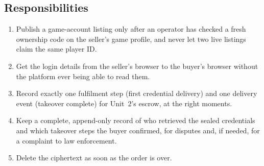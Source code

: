 \documentclass[11pt,a4paper]{article}
\begin{document}
\subsection{Responsibilities}
\begin{enumerate}[nosep]
  \item Publish a game-account listing only after an operator has checked a fresh ownership code on the seller's game profile, and never let two live listings claim the same player ID.
  \item Get the login details from the seller's browser to the buyer's browser without the platform ever being able to read them.
  \item Record exactly one fulfilment step (first credential delivery) and one delivery event (takeover complete) for Unit~2's escrow, at the right moments.
  \item Keep a complete, append-only record of who retrieved the sealed credentials and which takeover steps the buyer confirmed, for disputes and, if needed, for a complaint to law enforcement.
  \item Delete the ciphertext as soon as the order is over.
\end{enumerate}
\end{document}

